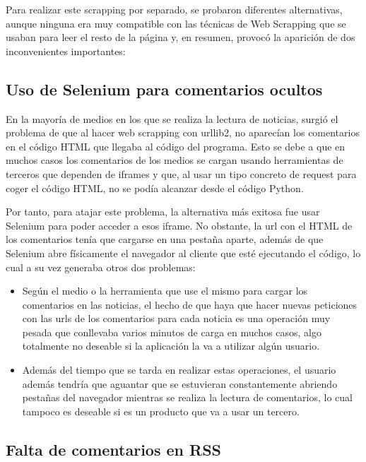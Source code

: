 Para realizar este scrapping por separado, se probaron diferentes alternativas, aunque ninguna era muy compatible con las técnicas de Web Scrapping que se usaban para leer el resto de la página y, en resumen, provocó la aparición de dos inconvenientes importantes:

\subsection{Uso de Selenium para comentarios ocultos}

En la mayoría de medios en los que se realiza la lectura de noticias, surgió el problema de que al hacer web scrapping con urllib2, no aparecían los comentarios en el código HTML que llegaba al código del programa. Esto se debe a que en muchos casos los comentarios de los medios se cargan usando herramientas de terceros que dependen de iframes y que, al usar un tipo concreto de request para coger el código HTML, no se podía alcanzar desde el código Python. 

Por tanto, para atajar este problema, la alternativa más exitosa fue usar Selenium para poder acceder a esos iframe. No obstante, la url con el HTML de los comentarios tenía que cargarse en una pestaña aparte, además de que Selenium abre físicamente el navegador al cliente que esté ejecutando el código, lo cual a su vez generaba otros dos problemas:

\begin{itemize}

\item Según el medio o la herramienta que use el mismo para cargar los comentarios en las noticias, el hecho de que haya que hacer nuevas peticiones con las urls de los comentarios para cada noticia es una operación muy pesada que conllevaba varios minutos de carga en muchos casos, algo totalmente no deseable si la aplicación la va a utilizar algún usuario.

\item Además del tiempo que se tarda en realizar estas operaciones, el usuario además tendría que aguantar que se estuvieran constantemente abriendo pestañas del navegador mientras se realiza la lectura de comentarios, lo cual tampoco es deseable si es un producto que va a usar un tercero.

\end{itemize}
 


\subsection{Falta de comentarios en RSS}


